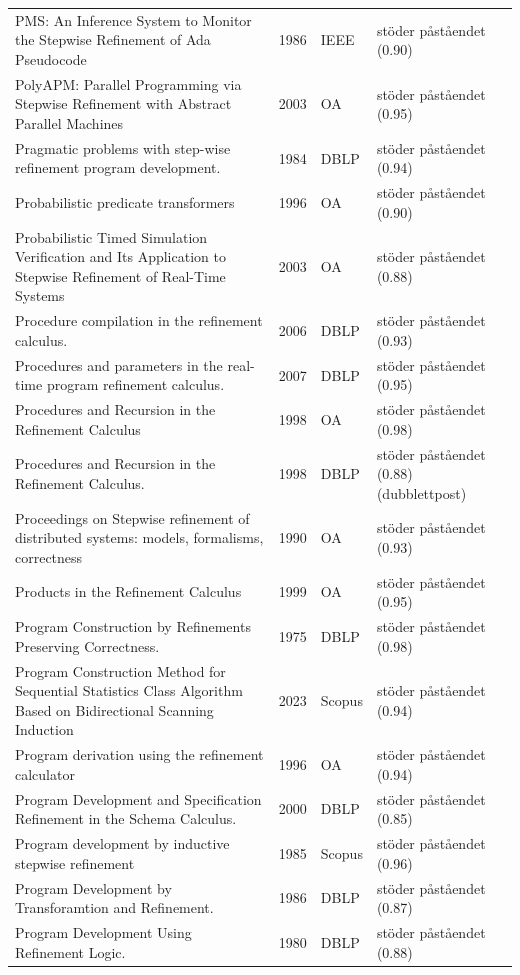 \begin{longtable}{@{}%
  >{\raggedright\arraybackslash}p{}c%
  >{\raggedright\arraybackslash}p{}%
  >{\raggedright\arraybackslash}p{}@{}}
PMS: An Inference System to Monitor the Stepwise Refinement of Ada Pseudocode & 1986 & IEEE & stöder påståendet (0.90) \\
PolyAPM: Parallel Programming via Stepwise Refinement with Abstract Parallel Machines & 2003 & OA & stöder påståendet (0.95) \\
Pragmatic problems with step-wise refinement program development. & 1984 & DBLP & stöder påståendet (0.94) \\
Probabilistic predicate transformers & 1996 & OA & stöder påståendet (0.90) \\
Probabilistic Timed Simulation Verification and Its Application to Stepwise Refinement of Real-Time Systems & 2003 & OA & stöder påståendet (0.88) \\
Procedure compilation in the refinement calculus. & 2006 & DBLP & stöder påståendet (0.93) \\
Procedures and parameters in the real-time program refinement calculus. & 2007 & DBLP & stöder påståendet (0.95) \\
Procedures and Recursion in the Refinement Calculus & 1998 & OA & stöder påståendet (0.98) \\
Procedures and Recursion in the Refinement Calculus. & 1998 & DBLP & stöder påståendet (0.88) (dubblettpost) \\
Proceedings on Stepwise refinement of distributed systems: models, formalisms, correctness & 1990 & OA & stöder påståendet (0.93) \\
Products in the Refinement Calculus & 1999 & OA & stöder påståendet (0.95) \\
Program Construction by Refinements Preserving Correctness. & 1975 & DBLP & stöder påståendet (0.98) \\
Program Construction Method for Sequential Statistics Class Algorithm Based on Bidirectional Scanning Induction & 2023 & Scopus & stöder påståendet (0.94) \\
Program derivation using the refinement calculator & 1996 & OA & stöder påståendet (0.94) \\
Program Development and Specification Refinement in the Schema Calculus. & 2000 & DBLP & stöder påståendet (0.85) \\
Program development by inductive stepwise refinement & 1985 & Scopus & stöder påståendet (0.96) \\
Program Development by Transforamtion and Refinement. & 1986 & DBLP & stöder påståendet (0.87) \\
Program Development Using Refinement Logic. & 1980 & DBLP & stöder påståendet (0.88) \\

\end{longtable}
